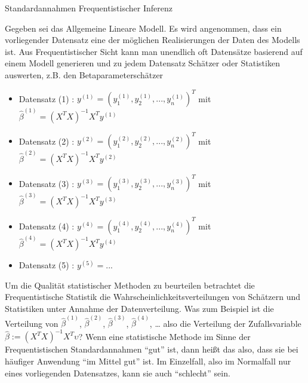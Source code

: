 \documentclass[
  8pt,
  ignorenonframetext,
]{beamer}
\begin{document}
\begin{frame}{}
\protect\hypertarget{section-6}{}
\small

Standardannahmen Frequentistischer Inferenz

\footnotesize
{}

Gegeben sei das Allgemeine Lineare Modell. Es wird angenommen, dass ein
vorliegender Datensatz eine der möglichen Realisierungen der Daten des
Modells ist. Aus Frequentistischer Sicht kann man unendlich oft
Datensätze basierend auf einem Modell generieren und zu jedem Datensatz
Schätzer oder Statistiken auswerten, z.B. den Betaparameterschätzer
\vspace{1mm}

\begin{itemize}
\item[] Datensatz (1) : $y^{(1)} = \left(y_1^{(1)}, y_2^{(1)}, ...,y_n^{(1)}\right)^T$  mit $\hat{\beta}^{(1)} = (X^TX)^{-1}X^Ty^{(1)}$
\item[] Datensatz (2) : $y^{(2)} = \left(y_1^{(2)}, y_2^{(2)}, ...,y_n^{(2)}\right)^T$  mit $\hat{\beta}^{(2)} = (X^TX)^{-1}X^Ty^{(2)}$
\item[] Datensatz (3) : $y^{(3)} = \left(y_1^{(3)}, y_2^{(3)}, ...,y_n^{(3)}\right)^T$  mit $\hat{\beta}^{(3)} = (X^TX)^{-1}X^Ty^{(3)}$
\item[] Datensatz (4) : $y^{(4)} = \left(y_1^{(4)}, y_2^{(4)}, ...,y_n^{(4)}\right)^T$  mit $\hat{\beta}^{(4)} = (X^TX)^{-1}X^Ty^{(4)}$
\item[] Datensatz (5) : $y^{(5)} = ...$
\end{itemize}

\vspace{1mm}

Um die Qualität statistischer Methoden zu beurteilen betrachtet die
Frequentistische Statistik die Wahrscheinlichkeitsverteilungen von
Schätzern und Statistiken unter Annahme der Datenverteilung. Was zum
Beispiel ist die Verteilung von \(\hat{\beta}^{(1)}\),
\(\hat{\beta}^{(2)}\), \(\hat{\beta}^{(3)}\), \(\hat{\beta}^{(4)}\),
\ldots{} also die Verteilung der Zufallsvariable
\(\hat{\beta} := (X^TX)^{-1}X^T\upsilon\)? Wenn eine statistische
Methode im Sinne der Frequentistischen Standardannahmen ``gut'' ist,
dann heißt das also, dass sie bei häufiger Anwendung ``im Mittel gut''
ist. Im Einzelfall, also im Normalfall nur eines vorliegenden
Datensatzes, kann sie auch ``schlecht'' sein.
\end{frame}
\end{document}
